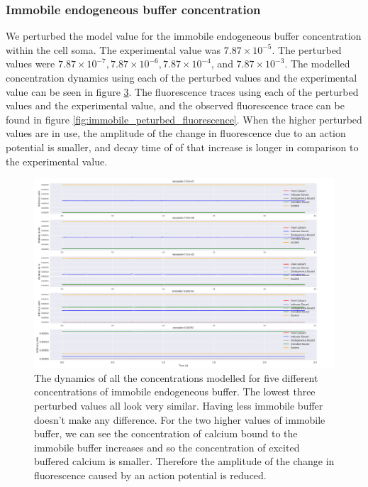 \documentclass[a4paper,12pt]{article}
\theoremstyle{definition}
\begin{document}
\begin{figure}[p]
\begin{subfigure}{\textwidth}
    \label{fig:indicator_perturbed_spike_inference_oasis}
  \end{subfigure}
  \caption{}
\end{figure}

\subsubsection{Immobile endogeneous buffer concentration}

We perturbed the model value for the immobile endogeneous buffer concentration within the cell soma. The experimental value was $7.87\times10^{-5}$. The perturbed values were $7.87\times10^{-7}, 7.87\times10^{-6}, 7.87\times10^{-4}$, and $7.87\times10^{-3}$. The modelled concentration dynamics using each of the perturbed values and the experimental value can be seen in figure \ref{fig:immobile_peturbed_calcium_dynamics}. The fluorescence traces using each of the perturbed values and the experimental value, and the observed fluorescence trace can be found in figure \ref{fig:immobile_peturbed_fluorescence}. When the higher perturbed values are in use, the amplitude of the change in fluorescence due to an action potential is smaller, and decay time of of that increase is longer in comparison to the experimental value.

\begin{figure}[ht]
  \centering
  \includegraphics[width=\textwidth]{figures/immobile_peturbed_calcium_dynamics_18.png}
  \caption{The dynamics of all the concentrations modelled for five different concentrations of immobile endogeneous buffer. The lowest three perturbed values all look very similar. Having less immobile buffer doesn't make any difference. For the two higher values of immobile buffer, we can see the concentration of calcium bound to the immobile buffer increases and so the concentration of excited buffered calcium is smaller. Therefore the amplitude of the change in fluorescence caused by an action potential is reduced.}
  \label{fig:immobile_peturbed_calcium_dynamics}
\end{figure}
\end{document}
